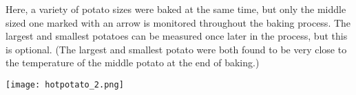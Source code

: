 \documentclass{ximera}
\begin{document}
Here, a variety of potato sizes were baked at the same time, but only the middle sized one marked with an arrow is monitored throughout the baking process.  The largest and smallest potatoes can be measured once later in the process, but this is optional.  (The largest and smallest potato were both found to be very close to the temperature of the middle potato at the end of baking.)

\begin{image}
\texttt{[image: hotpotato\_2.png]}
\end{image}
\end{document}
